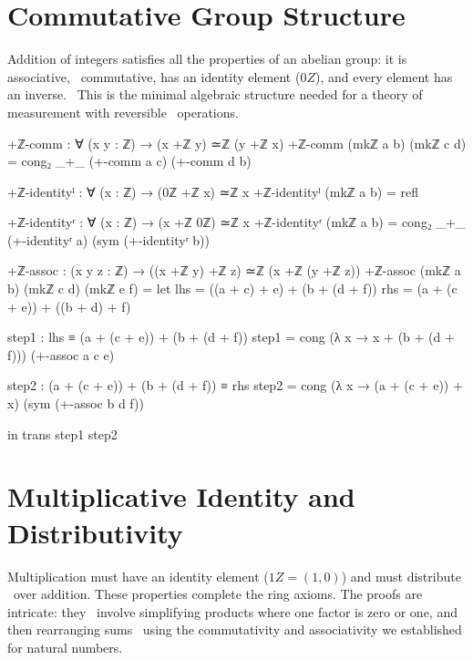 \documentclass[11pt,a4paper]{book}
\def\mathbb#1{#1}%
\begin{document}
\section{Commutative Group Structure}

Addition of integers satisfies all the properties of an abelian group: it is associative, \
commutative, has an identity element ($0\mathbb{Z}$), and every element has an inverse. \
This is the minimal algebraic structure needed for a theory of measurement with reversible \
operations.

\begin{code}
+ℤ-comm : ∀ (x y : ℤ) → (x +ℤ y) ≃ℤ (y +ℤ x)
+ℤ-comm (mkℤ a b) (mkℤ c d) = 
  cong₂ _+_ (+-comm a c) (+-comm d b)

+ℤ-identityˡ : ∀ (x : ℤ) → (0ℤ +ℤ x) ≃ℤ x
+ℤ-identityˡ (mkℤ a b) = refl

+ℤ-identityʳ : ∀ (x : ℤ) → (x +ℤ 0ℤ) ≃ℤ x
+ℤ-identityʳ (mkℤ a b) = cong₂ _+_ (+-identityʳ a) (sym (+-identityʳ b))

+ℤ-assoc : (x y z : ℤ) → ((x +ℤ y) +ℤ z) ≃ℤ (x +ℤ (y +ℤ z))
+ℤ-assoc (mkℤ a b) (mkℤ c d) (mkℤ e f) = 
  let
    lhs = ((a + c) + e) + (b + (d + f))
    rhs = (a + (c + e)) + ((b + d) + f)
    
    step1 : lhs ≡ (a + (c + e)) + (b + (d + f))
    step1 = cong (λ x → x + (b + (d + f))) (+-assoc a c e)
    
    step2 : (a + (c + e)) + (b + (d + f)) ≡ rhs
    step2 = cong (λ x → (a + (c + e)) + x) (sym (+-assoc b d f))
    
  in trans step1 step2
\end{code}

\section{Multiplicative Identity and Distributivity}

Multiplication must have an identity element ($1\mathbb{Z} = (1,0)$) and must distribute \
over addition. These properties complete the ring axioms. The proofs are intricate: they \
involve simplifying products where one factor is zero or one, and then rearranging sums \
using the commutativity and associativity we established for natural numbers.
\end{document}
